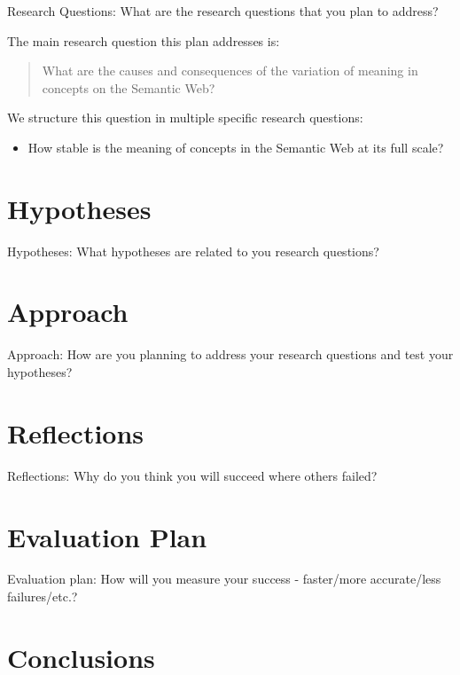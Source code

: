 \documentclass{llncs}
\begin{document}
Research Questions: What are the research questions that you plan to
address?

The main research question this plan addresses is:

\begin{quotation}
What are the causes and consequences of the variation of meaning in
concepts on the Semantic Web?
\end{quotation}

We structure this question in multiple specific research questions:

\begin{itemize}
  \item How stable is the meaning of concepts in the Semantic Web at
    its full scale?
\end{itemize}

\section{Hypotheses}
Hypotheses: What hypotheses are related to you research questions?

\section{Approach}
Approach: How are you planning to address your research questions and
test your hypotheses?

\section{Reflections}
Reflections: Why do you think you will succeed where others failed?

\section{Evaluation Plan}
Evaluation plan: How will you measure your success - faster/more
accurate/less failures/etc.?

\section{Conclusions}
\label{sec:conclusions}



%

\end{document}
